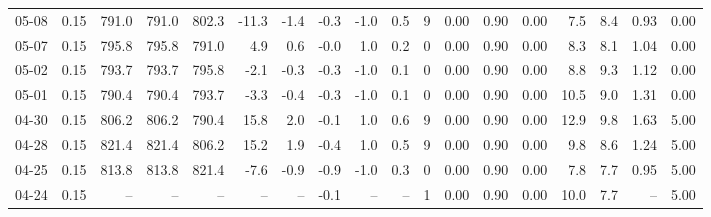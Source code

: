 \begin{threeparttable}
{\begin{tabular}{lrrrrrrrrrrrrrrrrr}
  05-08 &     0.15 & 791.0 & 791.0 & 802.3 &      -11.3 &           -1.4 &                      -0.3 &                     -1.0 &                 0.5 &              9 &       0.00 &      0.90 &           0.00 &              7.5 &                 8.4 &            0.93 &                   0.00 \\
  05-07 &     0.15 & 795.8 & 795.8 & 791.0 &        4.9 &            0.6 &                      -0.0 &                      1.0 &                 0.2 &              0 &       0.00 &      0.90 &           0.00 &              8.3 &                 8.1 &            1.04 &                   0.00 \\
  05-02 &     0.15 & 793.7 & 793.7 & 795.8 &       -2.1 &           -0.3 &                      -0.3 &                     -1.0 &                 0.1 &              0 &       0.00 &      0.90 &           0.00 &              8.8 &                 9.3 &            1.12 &                   0.00 \\
  05-01 &     0.15 & 790.4 & 790.4 & 793.7 &       -3.3 &           -0.4 &                      -0.3 &                     -1.0 &                 0.1 &              0 &       0.00 &      0.90 &           0.00 &             10.5 &                 9.0 &            1.31 &                   0.00 \\
  04-30 &     0.15 & 806.2 & 806.2 & 790.4 &       15.8 &            2.0 &                      -0.1 &                      1.0 &                 0.6 &              9 &       0.00 &      0.90 &           0.00 &             12.9 &                 9.8 &            1.63 &                   5.00 \\
  04-28 &     0.15 & 821.4 & 821.4 & 806.2 &       15.2 &            1.9 &                      -0.4 &                      1.0 &                 0.5 &              9 &       0.00 &      0.90 &           0.00 &              9.8 &                 8.6 &            1.24 &                   5.00 \\
  04-25 &     0.15 & 813.8 & 813.8 & 821.4 &       -7.6 &           -0.9 &                      -0.9 &                     -1.0 &                 0.3 &              0 &       0.00 &      0.90 &           0.00 &              7.8 &                 7.7 &            0.95 &                   5.00 \\
  04-24 &     0.15 &    -- &    -- &    -- &         -- &             -- &                      -0.1 &                       -- &                  -- &              1 &       0.00 &      0.90 &           0.00 &             10.0 &                 7.7 &              -- &                   5.00 \\

\end{tabular}}
\end{threeparttable}

